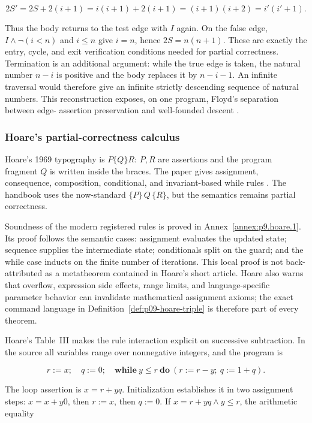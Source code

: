 \[
 2S'=2S+2(i+1)=i(i+1)+2(i+1)=(i+1)(i+2)=i'(i'+1).
\]

Thus the body returns to the test edge with \(I\) again.  On the false edge,
\(I\land\neg(i<n)\) and \(i\leq n\) give \(i=n\), hence
\(2S=n(n+1)\).  These are exactly the entry, cycle, and exit verification
conditions needed for partial correctness.  Termination is an additional
argument: while the true edge is taken, the natural number \(n-i\) is positive
and the body replaces it by \(n-i-1\).  An infinite traversal would therefore
give an infinite strictly descending sequence of natural numbers.  This
reconstruction exposes, on one program, Floyd's separation between edge-
assertion preservation and well-founded descent
\cite[pp.~24--31]{Floyd1967}.

\subsubsection{Hoare's partial-correctness calculus}

Hoare's 1969 typography is \(P\{Q\}R\): \(P,R\) are assertions and the program
fragment \(Q\) is written inside the braces.  The paper gives assignment,
consequence, composition, conditional, and invariant-based while rules
\cite[pp.~576--578]{Hoare1969}.  The handbook uses the now-standard
\(\{P\}\,Q\,\{R\}\), but the semantics remains partial correctness.

Soundness of the modern registered rules is proved in
Annex~\ref{annex:p9.hoare.1}.  Its proof follows the semantic cases: assignment
evaluates the updated state; sequence supplies the intermediate state;
conditionals split on the guard; and the while case inducts on the finite number
of iterations.  This local proof is not back-attributed as a metatheorem
contained in Hoare's short article.  Hoare also warns that overflow, expression
side effects, range limits, and language-specific parameter behavior can
invalidate mathematical assignment axioms; the exact command language in
Definition~\ref{def:p09-hoare-triple} is therefore part of every theorem.

Hoare's Table~III makes the rule interaction explicit on successive
subtraction.  In the source all variables range over nonnegative integers, and
the program is

\[
 r:=x;\quad q:=0;\quad
 \mathbf{while}\ y\leq r\ \mathbf{do}\ 
      (r:=r-y;\ q:=1+q).
\]

The loop assertion is \(x=r+yq\).  Initialization establishes it in two
assignment steps: \(x=x+y0\), then \(r:=x\), then \(q:=0\).  If
\(x=r+yq\land y\leq r\), the arithmetic equality

